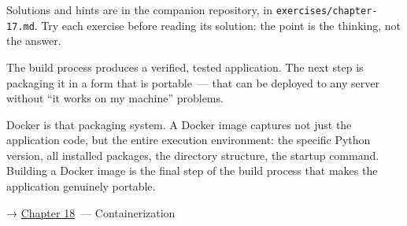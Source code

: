 \noindent{}Solutions and hints are in the companion repository, in \texttt{exercises/}\allowbreak{}\texttt{chapter-17.md}. Try each exercise before reading its solution: the point is the thinking, not the answer.

\label{17-build-process:whats-next}

The build process produces a verified, tested application. The next step is packaging it in a form that is portable~--- that can be deployed to any server without ``it works on my machine'' problems.

Docker is that packaging system. A Docker image captures not just the application code, but the entire execution environment: the specific Python version, all installed packages, the directory structure, the startup command. Building a Docker image is the final step of the build process that makes the application genuinely portable.

\noindent{}→ \hyperref[ch:18-containerization]{Chapter 18}~--- Containerization
